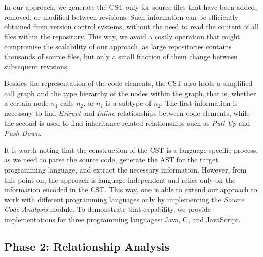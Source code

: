 In our approach, we generate the CST only for source files that have been added, removed, or modified between revisions. 
Such information can be efficiently obtained from version control systems, without the need to read the content of all files within the repository.
This way, we avoid a costly operation that might compromise the scalability of our approach, as large repositories contains thousands of source files, but only a small fraction of them change between subsequent revisions.

Besides the representation of the code elements, the CST also holds a simplified call graph and the type hierarchy of the nodes within the graph, that is, whether a certain node $n_1$ calls $n_2$, or $n_1$ is a subtype of $n_2$. The first information is necessary to find \emph{Extract} and \emph{Inline} relationships between code elements, while the second is used to find inheritance related relationships such as \emph{Pull Up} and \emph{Push Down}.


It is worth noting that the construction of the CST is a language-specific process, as we need to parse the source code, generate the AST for the target programming language, and extract the necessary information. However, from this point on, the approach is language-independent and relies only on the information encoded in the CST.
This way, one is able to extend our approach to work with different programming languages only by implementing the \emph{Source Code Analysis} module. To demonstrate that capability, we provide implementations for three programming languages: Java, C, and JavaScript.


\subsection{Phase 2: Relationship Analysis}


